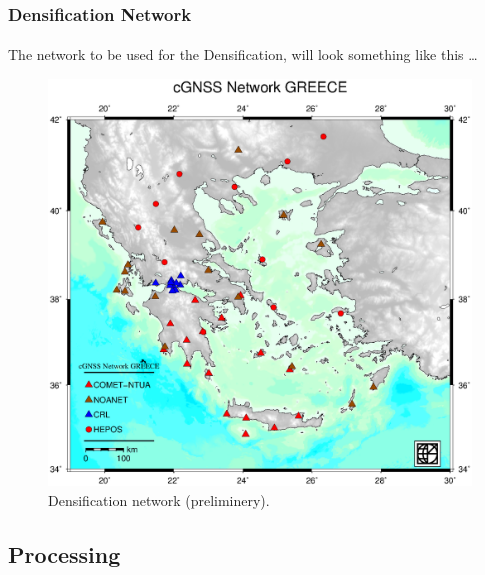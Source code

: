 \documentclass{beamer}
\begin{document}
\begin{frame}\frametitle{Densification Network}\framesubtitle{}
  The network to be used for the Densification, will look something like this \ldots
 \begin{figure}
 \begin{center}
 \includegraphics[trim={1cm 2cm 1cm 2.8cm},clip,width=.65\textwidth]{img/greeceall.eps}
 \caption{Densification network (preliminery).}
 \label{fig:dgrm}
 \end{center}
 \end{figure}
\end{frame}

\subsection{Processing}
\end{document}
